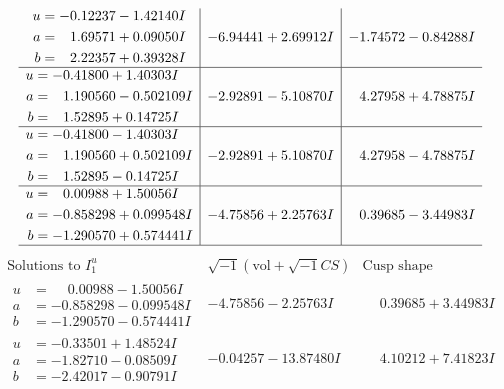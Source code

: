 \documentclass[1p]{elsarticle_modified}
\theoremstyle{definition}
\newcommand{\I}{\sqrt{-1}}
\begin{document}
$$\begin{array}{c|c|c}
\begin{aligned}
u &= -0.12237 - 1.42140 I \\
a &= \phantom{-}1.69571 + 0.09050 I \\
b &= \phantom{-}2.22357 + 0.39328 I\end{aligned}
 & -6.94441 + 2.69912 I & -1.74572 - 0.84288 I \\ \hline\begin{aligned}
u &= -0.41800 + 1.40303 I \\
a &= \phantom{-}1.190560 - 0.502109 I \\
b &= \phantom{-}1.52895 + 0.14725 I\end{aligned}
 & -2.92891 - 5.10870 I & \phantom{-}4.27958 + 4.78875 I \\ \hline\begin{aligned}
u &= -0.41800 - 1.40303 I \\
a &= \phantom{-}1.190560 + 0.502109 I \\
b &= \phantom{-}1.52895 - 0.14725 I\end{aligned}
 & -2.92891 + 5.10870 I & \phantom{-}4.27958 - 4.78875 I \\ \hline\begin{aligned}
u &= \phantom{-}0.00988 + 1.50056 I \\
a &= -0.858298 + 0.099548 I \\
b &= -1.290570 + 0.574441 I\end{aligned}
 & -4.75856 + 2.25763 I & \phantom{-}0.39685 - 3.44983 I\\
 \hline 
 \end{array}$$\newpage$$\begin{array}{c|c|c}  
\text{Solutions to }I^u_{1}& \I (\text{vol} + \sqrt{-1}CS) & \text{Cusp shape}\\
 \hline 
\begin{aligned}
u &= \phantom{-}0.00988 - 1.50056 I \\
a &= -0.858298 - 0.099548 I \\
b &= -1.290570 - 0.574441 I\end{aligned}
 & -4.75856 - 2.25763 I & \phantom{-}0.39685 + 3.44983 I \\ \hline\begin{aligned}
u &= -0.33501 + 1.48524 I \\
a &= -1.82710 - 0.08509 I \\
b &= -2.42017 - 0.90791 I\end{aligned}
 & -0.04257 - 13.87480 I & \phantom{-}4.10212 + 7.41823 I \\ \hline\begin{aligned}

\end{aligned}
\end{array}$$
\end{document}
